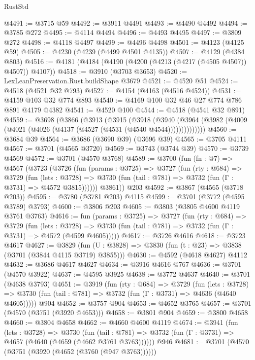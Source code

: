 \begin{lexlean}{RustStd}
\begin{coremodule}
@4491 := @3715 @59
@4492 := @3911 @4491
@4493 := @4490 @4492
@4494 := @3785 @272
@4495 := @4114 @4494
@4496 := @4493 @4495
@4497 := @3809 @272
@4498 := @4118 @4497
@4499 := @4496 @4498
@4501 := @4123 (@4125 @59)
@4505 := @4230 (@4239 (@4499 @4501 @4135))
@4507 := @4129 (@4384 @803)
@4516 := @4181 (@4184 (@4190 (@4200 (@4213 (@4217 (@4505 @4507)) @4507)) @4107))
@4518 := @3910 (@3703 @3653)
@4520 := LexLeanPreservation.Rust.buildShape @3679
@4521 := @4520 @51
@4524 := @4518 (@4521 @32 @793)
@4527 := @4154 (@4163 (@4516 @4524))
@4531 := @4159 @103 @32 @774 @893
@4540 := @4169 @100 @32 @46 @27 @774 @786 @891 @4179 @4382
@4541 := @4520 @100
@4544 := @4518 (@4541 @32 @891)
@4559 := @3698
    (@3866
      (@3913
        (@3915
          (@3918
            (@3940
              (@3964 (@3982 (@4009 (@4021 (@4026 (@4137 (@4527 (@4531 (@4540 @4544))))))))))))))
@4560 := @3684 @39
@4564 := @3686 (@3690 @39) (@3696 @39)
@4565 := @3705 @4111
@4567 := @3701 (@4565 @3720)
@4569 := @3743 (@3744 @39)
@4570 := @3739 @4569
@4572 := @3701 (@4570 @3768)
@4589 := @3700
    (fun (fn : @7) =>
    @4567
      (@3723
        (@3726
          (fun (params : @3725) =>
          @3727
            (fun (rty : @684) =>
            @3729
              (fun (lets : @3728) =>
              @3730 (fun (tail : @781) => @3732 (fun (Γ : @3731) => @4572 @3815))))))
        @3861))
    @203
@4592 := @3867 (@4565 (@3718 @203))
@4595 := @3780 (@3781 @203) @4115
@4599 := @3701 (@3772 (@4595 @3789) @3793)
@4600 := @3806 @203
@4605 := @3803 (@3805 @4600 @4119 @3761 @3763)
@4616 := fun (params : @3725) =>
  @3727
    (fun (rty : @684) =>
    @3729
      (fun (lets : @3728) =>
      @3730 (fun (tail : @781) => @3732 (fun (Γ : @3731) => @4572 (@4599 @4605)))))
@4617 := @3726 @4616
@4618 := @3723 @4617
@4627 := @3829 (fun (U : @3828) => @3830 (fun (t : @23) => @3838 (@3701 (@3844 @4115 @3719) @3855)))
@4630 := @4592 (@4618 @4627) @4112
@4632 := @3686 @4617 @4627
@4634 := @3916 @4616 @767
@4636 := @3701 (@4570 @3922)
@4637 := @4595 @3925
@4638 := @3772 @4637
@4640 := @3701 (@4638 @3793)
@4651 := @3919
    (fun (rty : @684) =>
    @3729
      (fun (lets : @3728) =>
      @3730 (fun (tail : @781) => @3732 (fun (Γ : @3731) => @4636 (@4640 @4605)))))
    @904
@4652 := @3757 @904
@4653 := @4652 @3765
@4657 := @3701 (@4570 (@3751 (@3920 @4653)))
@4658 := @3801 @904
@4659 := @3800 @4658
@4660 := @3804 @4658
@4662 := @4660 @4600 @4119
@4674 := @3941
    (fun (lets : @3728) =>
    @3730
      (fun (tail : @781) => @3732 (fun (Γ : @3731) => @4657 (@4640 (@4659 (@4662 @3761 @3763))))))
    @946
@4681 := @3701 (@4570 (@3751 (@3920 (@4652 (@3760 (@947 @3763))))))

\end{coremodule}
\end{lexlean}
